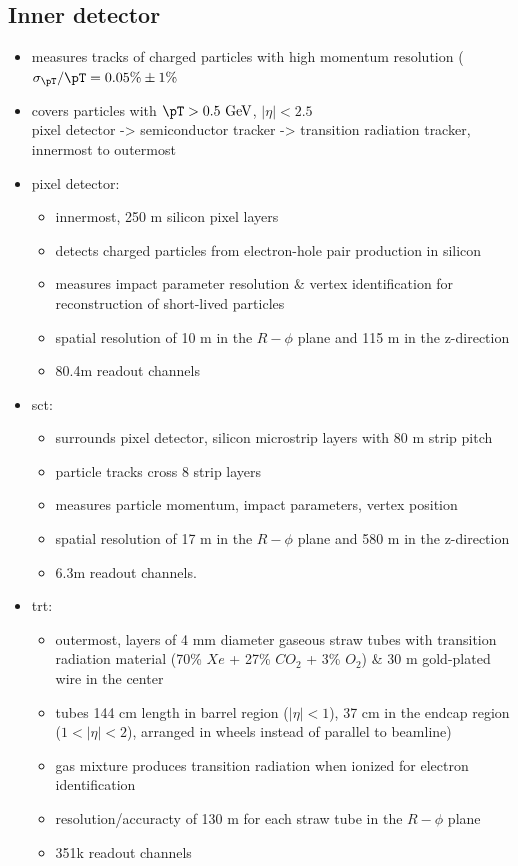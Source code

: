 \documentclass[../thesis.tex]{subfiles}
\begin{document}
\subsection{Inner detector}
\begin{itemize}
\item measures tracks of charged particles with high momentum resolution ($\sigma_{\pT} / \pT = 0.05\% \pm 1\%$
\item covers particles with $\pT>0.5 \text{ GeV}$, $|\eta| < 2.5$\\
pixel detector -> semiconductor tracker -> transition radiation tracker, innermost to outermost
\item pixel detector:
\begin{itemize}
\item innermost, 250 \textmu m silicon pixel layers
\item detects charged particles from electron-hole pair production in silicon
\item measures impact parameter resolution \& vertex identification for reconstruction of short-lived particles
\item spatial resolution of 10 \textmu m in the $R-\phi$ plane and 115 \textmu m in the z-direction
\item 80.4m readout channels
\end{itemize} 
\item sct:
\begin{itemize}
\item surrounds pixel detector, silicon microstrip layers with 80 \textmu m strip pitch
\item particle tracks cross 8 strip layers
\item measures particle momentum, impact parameters, vertex position
\item spatial resolution of 17 \textmu m in the $R-\phi$ plane and 580 \textmu m in the z-direction
\item 6.3m readout channels.
\end{itemize}
\item trt:
\begin{itemize}
\item outermost, layers of 4 mm diameter gaseous straw tubes with transition radiation material (70\% $Xe$ + 27\% $CO_2$ + 3\% $O_2$) \& 30 \textmu m gold-plated wire in the center
\item tubes 144 cm length in barrel region ($|\eta|<1$), 37 cm in the endcap region ($1<|\eta|<2$), arranged in wheels instead of parallel to beamline)
\item gas mixture produces transition radiation when ionized for electron identification
\item resolution/accuracty of 130 \textmu m for each straw tube in the $R-\phi$ plane
\item 351k readout channels
\end{itemize}
\end{itemize}
\end{document}
